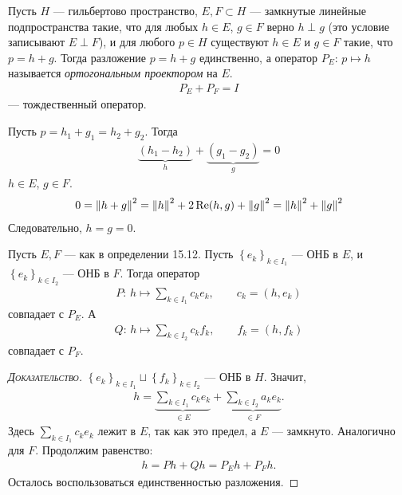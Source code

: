 \documentclass[../complex-analysis.tex]{subfiles}
\begin{document}
\begin{df}
 Пусть $ H $ --- гильбертово пространство, $ E, F \subset H $ --- замкнутые линейные подпространства такие, что для любых $ h \in E $, $ g \in F $ верно $ h \perp g $ (это условие записывают $ E \perp F $), и для любого $ p \in H $ существуют $ h \in E $ и $ g \in F $ такие, что $ p = h + g $. Тогда разложение $ p = h + g $ единственно, а оператор $ P_E \colon\, p \mapsto h $ называется \textit{ортогональным проектором} на $ E $.
 \begin{align*}
  P_E + P_F = I
 \end{align*} --- тождественный оператор.
\end{df}
\begin{remrk}
 Пусть $ p = h_1 + g_1 = h_2 + g_2 $. Тогда
 \begin{align*}
  \underbrace{(h_1 - h_2)}_h + \underbrace{(g_1-g_2)}_g = 0
 \end{align*} $ h \in E $, $ g \in F $.
 \begin{align*}
  0 = \left\| h+g \right\|^{2} = \left\| h \right\|^{2} + 2 \operatorname{Re} (h,g) + \left\| g \right\|^{2} = \left\| h \right\|^{2} + \left\| g \right\|^{2}
 \end{align*} Следовательно, $ h=g=0 $.
\end{remrk}

\begin{thm}
 Пусть $ E,F $ --- как в определении 15.12. Пусть $ \left\{e_k\right\}_{k\in I_1}  $ --- ОНБ в $ E $, и $ \left\{e_k\right\}_{k\in I_2}  $ --- ОНБ в $ F $. Тогда оператор \begin{align*}
  P \colon\, h \mapsto \sum_{k\in I_1} c_ke_k, \qquad c_k=(h,e_k)
 \end{align*} совпадает с $ P_E $. А
 \begin{align*}
  Q \colon\, h \mapsto \sum_{k \in I_2} c_kf_k, \qquad f_k=(h,f_k)
 \end{align*} совпадает с $ P_F $.
\end{thm}
\begin{proof}[\normalfont\textsc{Доказательство}]
 $ \left\{e_k\right\}_{k \in I_1} \sqcup \left\{f_k\right\}_{k \in I_2}  $ --- ОНБ в $ H $. Значит,
 \begin{align*}
  h = \underbrace{\sum_{k\in I_1}c_k e_k}_{\in E} + \underbrace{\sum_{k \in I_2} a_k e_k}_{\in F}.
 \end{align*} Здесь $ \sum_{k\in I_1}c_ke_k  $ лежит в $ E $, так как это предел, а $ E $ --- замкнуто. Аналогично для $ F $. Продолжим равенство:
 \begin{align*}
  h = P h + Q h = P_E h + P_F h.
 \end{align*} Осталось воспользоваться единственностью разложения.
\end{proof}
\end{document}

